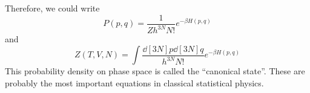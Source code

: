 \documentclass[a4paper,twoside,master.tex]{subfiles}
\begin{document}
Therefore, we could write
\begin{equation}
    P(p,q) = \frac{1}{Z h^{3N} N!} e^{- \beta H(p,q)}
\end{equation}
and
\begin{equation}
    Z(T,V,N) = \int \frac{\dd[3N]{p} \dd[3N]{q}}{h^{3N} N!} e^{- \beta H(p,q)}
\end{equation}
This probability density on phase space is called the ``canonical state''. These are probably the most important equations in classical statistical physics.
\end{document}
